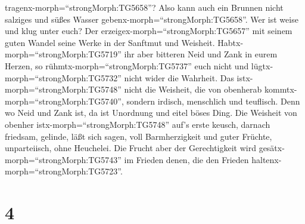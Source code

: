 tragenx-morph=``strongMorph:TG5658''? Also kann auch ein Brunnen nicht
salziges und süßes Wasser gebenx-morph=``strongMorph:TG5658''.
 Wer ist weise und klug unter euch? Der
erzeigex-morph=``strongMorph:TG5657'' mit seinem guten Wandel seine
Werke in der Sanftmut und Weisheit. 
Habtx-morph=``strongMorph:TG5719'' ihr aber bitteren Neid und Zank in
eurem Herzen, so rühmtx-morph=``strongMorph:TG5737'' euch nicht und
lügtx-morph=``strongMorph:TG5732'' nicht wider die Wahrheit.
 Das istx-morph=``strongMorph:TG5748'' nicht die Weisheit,
die von obenherab kommtx-morph=``strongMorph:TG5740'', sondern irdisch,
menschlich und teuflisch.  Denn wo Neid und Zank ist, da
ist Unordnung und eitel böses Ding.  Die Weisheit von
obenher istx-morph=``strongMorph:TG5748'' auf's erste keusch, darnach
friedsam, gelinde, läßt sich sagen, voll Barmherzigkeit und guter
Früchte, unparteiisch, ohne Heuchelei.  Die Frucht aber der
Gerechtigkeit wird gesätx-morph=``strongMorph:TG5743'' im Frieden denen,
die den Frieden haltenx-morph=``strongMorph:TG5723''.

\hypertarget{section-3}{%
\section{4}\label{section-3}}

